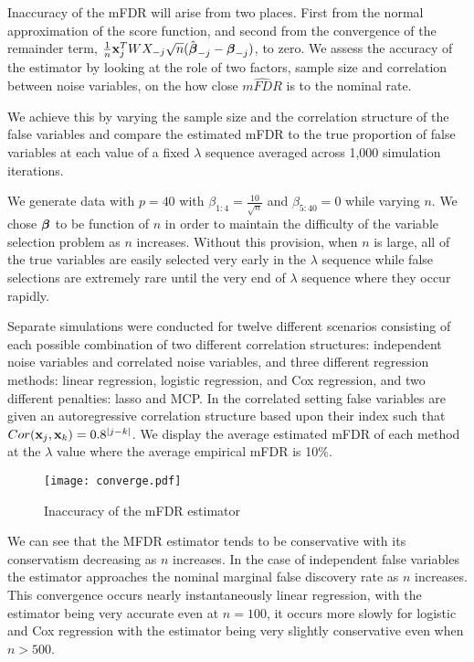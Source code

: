 Inaccuracy of the mFDR will arise from two places. First from the normal approximation of the score function, and second from the convergence of the remainder term, $\frac{1}{n}\mathbf{x}_j^T W X_{-j}\sqrt{n}(\hat{\boldsymbol{\beta}}_{-j} -  \boldsymbol{\beta}_{-j})$, to zero.  We assess the accuracy of the estimator by looking at the role of two factors, sample size and correlation between noise variables, on the how close $\widehat{mFDR}$ is to the nominal rate.

We achieve this by varying the sample size and the correlation structure of the false variables and compare the estimated mFDR to the true proportion of false variables at each value of a fixed $\lambda$ sequence averaged across 1,000 simulation iterations.

We generate data with $p = 40$ with $\beta_{1:4} = \frac{10}{\sqrt{n}}$ and $\beta_{5:40} = 0$ while varying $n$.  We chose $\boldsymbol{\beta}$ to be function of $n$ in order to maintain the difficulty of the variable selection problem as $n$ increases.  Without this provision, when $n$ is large, all of the true variables are easily selected very early in the $\lambda$ sequence while false selections are extremely rare until the very end of $\lambda$ sequence where they occur rapidly.

Separate simulations were conducted for twelve different scenarios consisting of each possible combination of two different correlation structures: independent noise variables and correlated noise variables, and three different regression methods: linear regression, logistic regression, and Cox regression, and two different penalties: lasso and MCP.  In the correlated setting false variables are given an autoregressive correlation structure based upon their index such that $Cor(\mathbf{x}_j,\mathbf{x}_k) = 0.8^{|j - k|}$. We display the average estimated mFDR of each method at the $\lambda$ value where the average empirical mFDR is 10\%.

\begin{figure} [!htb]
 \centering
  \texttt{[image: converge.pdf]}
  \caption{Inaccuracy of the mFDR estimator }
\end{figure}

We can see that the MFDR estimator tends to be conservative with its conservatism decreasing as $n$ increases.  In the case of independent false variables the estimator approaches the nominal marginal false discovery rate as $n$ increases.  This convergence occurs nearly instantaneously linear regression, with the estimator being very accurate even at $n=100$, it occurs more slowly for logistic and Cox regression with the estimator being very slightly conservative even when $n > 500$.

